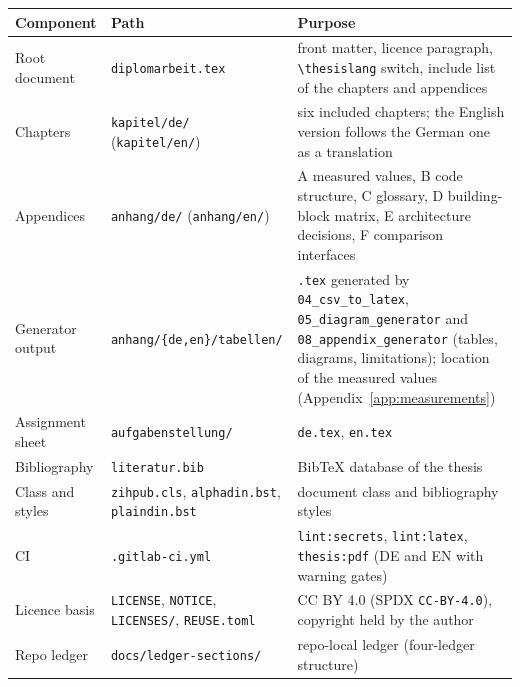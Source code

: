 {\small
\begin{longtable}{@{}>{\raggedright\arraybackslash}p{}>{\raggedright\arraybackslash}p{}>{\raggedright\arraybackslash}p{}@{}}
\toprule
\textbf{Component} & \textbf{Path} & \textbf{Purpose} \\
\midrule
\endhead%
\midrule
\endfoot%
\bottomrule
\endlastfoot%
Root document &
\texttt{diplomarbeit.tex} &
front matter, licence paragraph, \texttt{\textbackslash{}thesislang} switch, include list of the chapters and
appendices \\
Chapters &
\texttt{kapitel/\allowbreak{}de/} (\texttt{kapitel/\allowbreak{}en/}) &
six included chapters; the English version follows the German one as a translation \\
Appendices &
\texttt{anhang/\allowbreak{}de/} (\texttt{anhang/\allowbreak{}en/}) &
A measured values, B code structure, C glossary, D building-block matrix, E architecture decisions,
F comparison interfaces \\
Generator output &
\texttt{anhang/\allowbreak{}\{de,en\}/\allowbreak{}tabellen/} &
\texttt{.tex} generated by \texttt{04\_\allowbreak{}csv\_\allowbreak{}to\_\allowbreak{}latex}, \texttt{05\_\allowbreak{}diagram\_\allowbreak{}generator} and
\texttt{08\_\allowbreak{}appendix\_\allowbreak{}generator} (tables, diagrams,
limitations); location of the measured values (Appendix~\ref{app:measurements}) \\
Assignment sheet &
\texttt{aufgabenstellung/} &
\texttt{de.tex}, \texttt{en.tex} \\
Bibliography &
\texttt{literatur.bib} &
BibTeX database of the thesis \\
Class and styles &
\texttt{zihpub.cls}, \texttt{alphadin.bst}, \texttt{plaindin.bst} &
document class and bibliography styles \\
CI &
\texttt{.gitlab-ci.yml} &
\texttt{lint:secrets}, \texttt{lint:latex}, \texttt{thesis:pdf} (DE and EN with warning gates) \\
Licence basis &
\texttt{LICENSE}, \texttt{NOTICE}, \texttt{LICENSES/}, \texttt{REUSE.toml} &
CC BY 4.0 (SPDX \texttt{CC-BY-4.0}), copyright held by the author \\
Repo ledger &
\texttt{docs/\allowbreak{}ledger-sections/} &
repo-local ledger (four-ledger structure) \\
\end{longtable}
}
